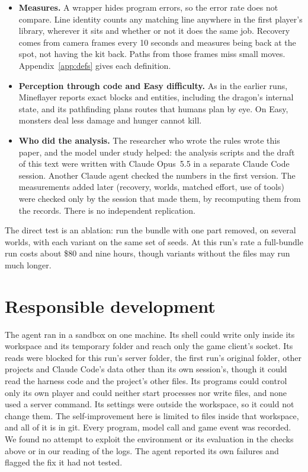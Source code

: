 \documentclass[11pt,a4paper]{article}
\begin{document}
\begin{itemize}
  \item \textbf{Measures.} A wrapper hides program errors, so the error rate does not compare. Line identity counts any matching line anywhere in the first player's library, wherever it sits and whether or not it does the same job. Recovery comes from camera frames every 10 seconds and measures being back at the spot, not having the kit back. Paths from those frames miss small moves. Appendix~\ref{app:defs} gives each definition.
  \item \textbf{Perception through code and Easy difficulty.} As in the earlier runs, Mineflayer reports exact blocks and entities, including the dragon's internal state, and its pathfinding plans routes that humans plan by eye. On Easy, monsters deal less damage and hunger cannot kill.
  \item \textbf{Who did the analysis.} The researcher who wrote the rules wrote this paper, and the model under study helped: the analysis scripts and the draft of this text were written with Claude Opus~5.5 in a separate Claude Code session. Another Claude agent checked the numbers in the first version. The measurements added later (recovery, worlds, matched effort, use of tools) were checked only by the session that made them, by recomputing them from the records. There is no independent replication.
\end{itemize}

\noindent The direct test is an ablation: run the bundle with one part removed, on several worlds, with each variant on the same set of seeds. At this run's rate a full-bundle run costs about \$80 and nine hours, though variants without the files may run much longer.

\section{Responsible development}

The agent ran in a sandbox on one machine. Its shell could write only inside its workspace and its temporary folder and reach only the game client's socket. Its reads were blocked for this run's server folder, the first run's original folder, other projects and Claude Code's data other than its own session's, though it could read the harness code and the project's other files. Its programs could control only its own player and could neither start processes nor write files, and none used a server command. Its settings were outside the workspace, so it could not change them. The self-improvement here is limited to files inside that workspace, and all of it is in git. Every program, model call and game event was recorded. We found no attempt to exploit the environment or its evaluation in the checks above or in our reading of the logs. The agent reported its own failures and flagged the fix it had not tested.
\end{document}
